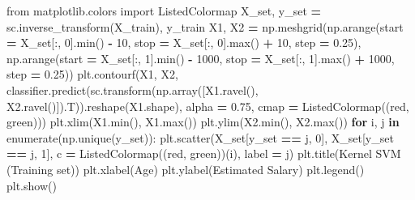 \documentclass[
]{book}
\newenvironment{Shaded}{\begin{snugshade}}{\end{snugshade}}
\newcommand{\BuiltInTok}[1]{#1}
\newcommand{\ControlFlowTok}[1]{\textcolor[rgb]{0.13,0.29,0.53}{\textbf{#1}}}
\newcommand{\DecValTok}[1]{\textcolor[rgb]{0.00,0.00,0.81}{#1}}
\newcommand{\FloatTok}[1]{\textcolor[rgb]{0.00,0.00,0.81}{#1}}
\newcommand{\ImportTok}[1]{#1}
\newcommand{\KeywordTok}[1]{\textcolor[rgb]{0.13,0.29,0.53}{\textbf{#1}}}
\newcommand{\NormalTok}[1]{#1}
\newcommand{\OperatorTok}[1]{\textcolor[rgb]{0.81,0.36,0.00}{\textbf{#1}}}
\newcommand{\StringTok}[1]{\textcolor[rgb]{0.31,0.60,0.02}{#1}}
\theoremstyle{definition}
\theoremstyle{definition}
\theoremstyle{definition}
\theoremstyle{definition}
\theoremstyle{remark}
\begin{document}
\begin{Shaded}
\begin{Highlighting}[]
\ImportTok{from}\NormalTok{ matplotlib.colors }\ImportTok{import}\NormalTok{ ListedColormap}
\NormalTok{X\_set, y\_set }\OperatorTok{=}\NormalTok{ sc.inverse\_transform(X\_train), y\_train}
\NormalTok{X1, X2 }\OperatorTok{=}\NormalTok{ np.meshgrid(np.arange(start }\OperatorTok{=}\NormalTok{ X\_set[:, }\DecValTok{0}\NormalTok{].}\BuiltInTok{min}\NormalTok{() }\OperatorTok{{-}} \DecValTok{10}\NormalTok{, stop }\OperatorTok{=}\NormalTok{ X\_set[:, }\DecValTok{0}\NormalTok{].}\BuiltInTok{max}\NormalTok{() }\OperatorTok{+} \DecValTok{10}\NormalTok{, step }\OperatorTok{=} \FloatTok{0.25}\NormalTok{),}
\NormalTok{                     np.arange(start }\OperatorTok{=}\NormalTok{ X\_set[:, }\DecValTok{1}\NormalTok{].}\BuiltInTok{min}\NormalTok{() }\OperatorTok{{-}} \DecValTok{1000}\NormalTok{, stop }\OperatorTok{=}\NormalTok{ X\_set[:, }\DecValTok{1}\NormalTok{].}\BuiltInTok{max}\NormalTok{() }\OperatorTok{+} \DecValTok{1000}\NormalTok{, step }\OperatorTok{=} \FloatTok{0.25}\NormalTok{))}
\NormalTok{plt.contourf(X1, X2, classifier.predict(sc.transform(np.array([X1.ravel(), X2.ravel()]).T)).reshape(X1.shape),}
\NormalTok{             alpha }\OperatorTok{=} \FloatTok{0.75}\NormalTok{, cmap }\OperatorTok{=}\NormalTok{ ListedColormap((}\StringTok{\textquotesingle{}red\textquotesingle{}}\NormalTok{, }\StringTok{\textquotesingle{}green\textquotesingle{}}\NormalTok{)))}
\NormalTok{plt.xlim(X1.}\BuiltInTok{min}\NormalTok{(), X1.}\BuiltInTok{max}\NormalTok{())}
\NormalTok{plt.ylim(X2.}\BuiltInTok{min}\NormalTok{(), X2.}\BuiltInTok{max}\NormalTok{())}
\ControlFlowTok{for}\NormalTok{ i, j }\KeywordTok{in} \BuiltInTok{enumerate}\NormalTok{(np.unique(y\_set)):}
\NormalTok{    plt.scatter(X\_set[y\_set }\OperatorTok{==}\NormalTok{ j, }\DecValTok{0}\NormalTok{], X\_set[y\_set }\OperatorTok{==}\NormalTok{ j, }\DecValTok{1}\NormalTok{], c }\OperatorTok{=}\NormalTok{ ListedColormap((}\StringTok{\textquotesingle{}red\textquotesingle{}}\NormalTok{, }\StringTok{\textquotesingle{}green\textquotesingle{}}\NormalTok{))(i), label }\OperatorTok{=}\NormalTok{ j)}
\NormalTok{plt.title(}\StringTok{\textquotesingle{}Kernel SVM (Training set)\textquotesingle{}}\NormalTok{)}
\NormalTok{plt.xlabel(}\StringTok{\textquotesingle{}Age\textquotesingle{}}\NormalTok{)}
\NormalTok{plt.ylabel(}\StringTok{\textquotesingle{}Estimated Salary\textquotesingle{}}\NormalTok{)}
\NormalTok{plt.legend()}
\NormalTok{plt.show()}
\end{Highlighting}
\end{Shaded}
\end{document}
